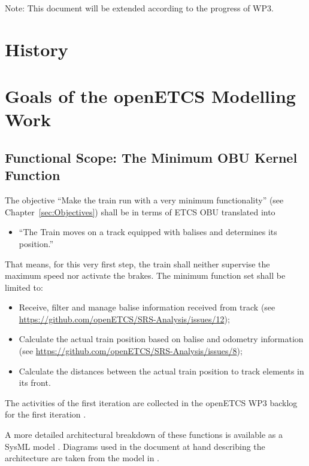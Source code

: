 \documentclass{template/openetcs_report}
\begin{document}
Note: This document will be extended according to the progress of WP3. 


\section{History}

\section{Goals of the openETCS Modelling Work}


\subsection{Functional Scope: The Minimum OBU Kernel Function}
\label{sec:FunctionalScopeTheMinimumOBUKernelFunction}

The objective ``Make the train run with a very minimum functionality'' (see Chapter~\ref{sec:Objectives}) shall be in terms of ETCS OBU translated into 
\begin{itemize}
	\item ``The Train moves on a track equipped with balises and determines its position.''
\end{itemize}
That means, for this very first step, the train shall neither supervise the maximum speed nor activate the brakes. The minimum function set shall be limited to:
\begin{itemize}
	\item Receive, filter and manage balise information received from track (see \url{https://github.com/openETCS/SRS-Analysis/issues/12});
	\item Calculate the actual train position based on balise and odometry information (see \url{https://github.com/openETCS/SRS-Analysis/issues/8});
	\item Calculate the distances between the actual train position to track elements in its front.
\end{itemize}
The activities of the first iteration are collected in the openETCS WP3 backlog for the first iteration \cite{firstIteration}.

A more detailed architectural breakdown of these functions is available as a SysML model \cite{sysml-model}. Diagrams used in the document at hand describing the architecture are taken from the model in \cite{sysml-model}.
\end{document}
